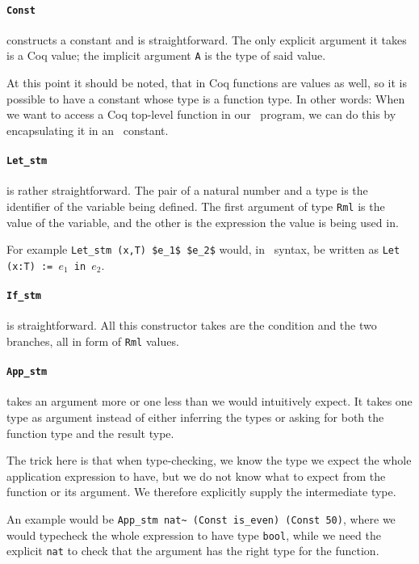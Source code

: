 \documentclass[11pt, leqno, titlepage]{article}
\def\coqe{\lstinline[language=Coq, basicstyle=\small]}
\theoremstyle{definition}
\begin{document}
\paragraph{\coqe{Const}} constructs a constant and is straightforward. The only explicit
argument it takes is a Coq value; the implicit argument \texttt{A} is the type of
said value.

At this point it should be noted, that in Coq functions are values as well, so it is
possible to have a constant whose type is a function type. In other words: When we
want to access a Coq top-level function in our \rmlx\ program, we can do this by
encapsulating it in an \rmlx\ constant. 

\paragraph{\coqe{Let_stm}} is rather straightforward. The pair of a natural number and a
type is the identifier of the variable being defined. The first argument of type
\coqe{Rml} is the value of the variable, and the other is the expression the value is
being used in.

For example \coqe{Let_stm (x,T) $e_1$ $e_2$} would, in \rml\ syntax, be written as
\texttt{Let (x:T) := $e_1$ in $e_2$}. 

\paragraph{\coqe{If_stm}} is straightforward. All this constructor takes are the condition
and the two branches, all in form of \coqe{Rml} values.

\paragraph{\coqe{App_stm}} takes an argument more or one less than we would
intuitively expect. It takes one type as argument instead of either inferring the
types or asking for both the function type and the result type.

The trick here is that when type-checking, we know the type we expect the whole application
expression to have, but we do not know what to expect from the function or its
argument. We therefore explicitly supply the intermediate type. 

An example would be \coqe{App_stm nat~ (Const is_even) (Const 50)}, where we would
typecheck the whole expression to have type \coqe{bool}, while we need the explicit
\coqe{nat} to check that the argument has the right type for the function.
\end{document}
